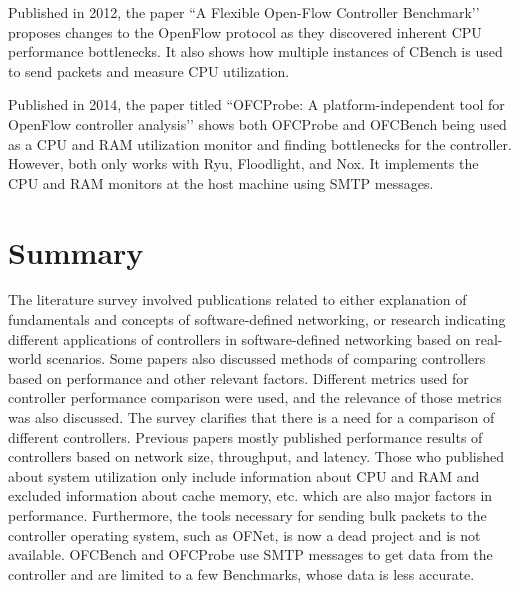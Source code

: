 Published in 2012, the paper ``A Flexible Open-Flow Controller Benchmark’’ \cite{flexible} proposes changes to the OpenFlow protocol as they discovered inherent CPU performance bottlenecks. It also shows how multiple instances of CBench is used to send packets and measure CPU utilization.

Published in 2014, the paper titled ``OFCProbe: A platform-independent tool for OpenFlow controller analysis’’ \cite{ofcprobe} shows both OFCProbe and OFCBench being used as a CPU and RAM utilization monitor and finding bottlenecks for the controller. However, both only works with Ryu, Floodlight, and Nox. It implements the CPU and RAM monitors at the host machine using SMTP messages.

\section*{Summary}

The literature survey involved publications related to either explanation of fundamentals and concepts of software-defined networking, or research indicating different applications of controllers in software-defined networking based on real-world scenarios. Some papers also discussed methods of comparing controllers based on performance and other relevant factors. Different metrics used for controller performance comparison were used, and the relevance of those metrics was also discussed. The survey clarifies that there is a need for a comparison of different controllers. Previous papers mostly published performance results of controllers based on network size, throughput, and latency. Those who published about system utilization only include information about CPU and RAM and excluded information about cache memory, etc. which are also major factors in performance. Furthermore, the tools necessary for sending bulk packets to the controller operating system, such as OFNet, is now a dead project and is not available. OFCBench and OFCProbe use SMTP messages to get data from the controller and are limited to a few Benchmarks, whose data is less accurate.